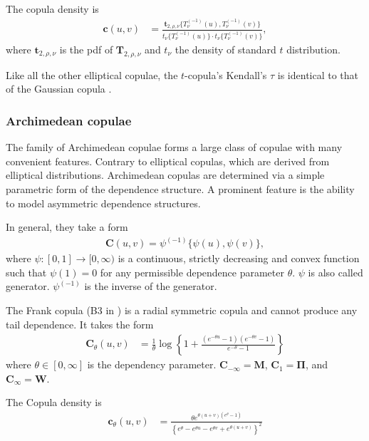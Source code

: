 The copula density is
\begin{align*}
    \bm{c}(u,v) &= \frac{\bm{t}_{2, \rho, \nu}\{T^{(-1)}_\nu(u), T^{(-1)}_\nu(v)\}}
    {t_\nu\{T^{(-1)}_\nu(u)\}\cdot t_\nu\{T^{(-1)}_\nu(v)\}},
    \end{align*}
where $\bm{t}_{2,\rho, \nu}$ is the pdf of $\bm{T}_{2, \rho, \nu}$
and $t_\nu$ the density of standard $t$ distribution.\medskip

Like all the other elliptical copulae, the $t$-copula's Kendall's
$\tau$ is identical to that of the Gaussian copula \citep[see][and
references therein]{demarta2005t}. 


\subsubsection{Archimedean copulae}\label{sec:archimedean-copula}
The family of Archimedean copulae forms a large class of copulae with
many convenient features.
Contrary to elliptical copulas, which are derived from
elliptical distributions.
Archimedean copulas are determined via a simple parametric form of the dependence structure.
A prominent feature is the ability to model asymmetric dependence structures. \medskip

In general, they take a form
\begin{align*}
    \bm{C}(u,v)= \psi^{(-1)}\{\psi(u), \psi(v)\},
    \end{align*}
where $\psi:[0,1] \rightarrow [0,\infty)$ is a continuous, strictly
decreasing and convex function such that $\psi(1)=0$ for any
permissible dependence parameter $\theta$. $\psi$ is also called
generator. $\psi^{(-1)}$ is the inverse of the generator. \medskip

The Frank copula (B3 in \citet{joe1997multivariate}) is a radial symmetric copula and cannot produce any tail dependence.
It takes the form
\begin{align*}
    \bm{C}_{\theta}(u,v) &= \frac{1}{\theta}
    \log \left\{
    1 + \frac{(e^{-\theta u}-1)(e^{-\theta v}-1)}{e^{-\theta}-1}
    \right\}
    \end{align*}
where $\theta \in [0, \infty]$ is the dependency parameter.
$\bm{C}_{-\infty} = \bm{M}$, $\bm{C}_1 = \bm{\Pi}$, and $\bm{C}_\infty = \bm{W}$.

The Copula density is
\begin{align}
    \bm{c}_{\theta}(u,v) &= \frac{\theta e^{\theta(u+v)(e^\theta-1)}}
    {\left\{e^\theta-e^{\theta u}-e^{\theta v}+e^{\theta (u+v)}\right\}^2}
    \end{align}\medskip

